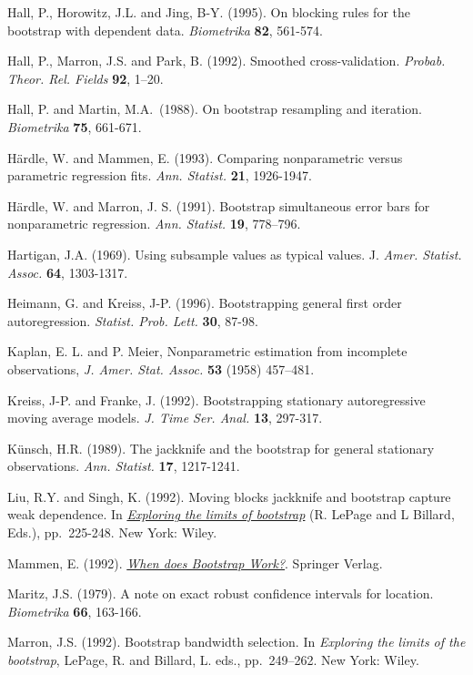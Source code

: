 \documentclass[
]{book}
\theoremstyle{break}
\theoremstyle{nonumberplain}
\begin{document}
Hall, P., Horowitz, J.L. and Jing, B-Y. (1995). On blocking rules for
the bootstrap with dependent data. \emph{Biometrika} \textbf{82}, 561-574.

Hall, P., Marron, J.S. and Park, B. (1992). Smoothed cross-validation.
\emph{Probab. Theor. Rel. Fields} \textbf{92}, 1--20.

Hall, P. and Martin, M.A.~(1988). On bootstrap resampling and iteration.
\emph{Biometrika} \textbf{75}, 661-671.

Härdle, W. and Mammen, E. (1993). Comparing nonparametric versus
parametric regression fits. \emph{Ann. Statist.} \textbf{21}, 1926-1947.

Härdle, W. and Marron, J. S. (1991). Bootstrap simultaneous error bars
for nonparametric regression. \emph{Ann. Statist.} \textbf{19}, 778--796.

Hartigan, J.A. (1969). Using subsample values as typical values. J.
\emph{Amer. Statist. Assoc.} \textbf{64}, 1303-1317.

Heimann, G. and Kreiss, J-P. (1996). Bootstrapping general first order
autoregression. \emph{Statist. Prob. Lett.} \textbf{30}, 87-98.

Kaplan, E. L. and P. Meier, Nonparametric estimation from incomplete
observations, \emph{J. Amer. Stat. Assoc.} \textbf{53} (1958) 457--481.

Kreiss, J-P. and Franke, J. (1992). Bootstrapping stationary
autoregressive moving average models. \emph{J. Time Ser. Anal.} \textbf{13},
297-317.

Künsch, H.R. (1989). The jackknife and the bootstrap for general
stationary observations. \emph{Ann. Statist.} \textbf{17}, 1217-1241.

Liu, R.Y. and Singh, K. (1992). Moving blocks jackknife and bootstrap
capture weak dependence. In \href{https://books.google.es/books?hl=es&lr=&id=ZJzIpNZNVLgC&oi=fnd&pg=PA3&dq=Exploring+the+limits+of+the+bootstrap}{\emph{Exploring the limits of bootstrap}}
(R. LePage and L Billard, Eds.), pp.~225-248. New York: Wiley.

Mammen, E. (1992). \href{https://books.google.es/books?hl=es&lr=&id=zpDfBwAAQBAJ&oi=fnd&pg=PP8&dq=When+does+Bootstrap+Work\%3F}{\emph{When does Bootstrap Work?}}.
Springer Verlag.

Maritz, J.S. (1979). A note on exact robust confidence intervals for
location. \emph{Biometrika} \textbf{66}, 163-166.

Marron, J.S. (1992). Bootstrap bandwidth selection. In
\emph{Exploring the limits of the bootstrap}, LePage, R. and Billard,
L. eds., pp.~249--262. New York: Wiley.
\end{document}
